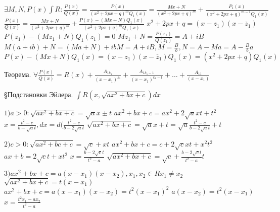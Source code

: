 \documentclass[12pt]{article}
\begin{document}
    $\exists M, N, P(x) \int R: \frac{P(x)}{Q(x)} = \frac{P(x)}{(x^2 + 2px + q)^m Q_1(x)} = \frac{Mx + N}{(x^2 + 2px + q)^m} + \frac{P_1(x)}{(x^2 + 2px + q)^{m-1} Q_1(x)}$ \newline
    $\frac{P(x)}{Q(x)} = \frac{Mx + N}{(x^2 + 2px + q)^m} + \frac{P(x) - (Mx + N)Q_1(x)}{(x^2 + 2px + q)^m Q_1(x)}$ \newline
    $x^2 + 2px + q = (x - z_1)(x - \overline z_1)$ \newline
    $P(z_1) - (Mz_1 + N)Q_1(z_1) = 0$ \newline
    $Mz_1 + N = \frac{P(z_1)}{Q(z_1)} = A + iB$ \newline
    $M(a+ib) + N = (Ma+N) + ibM = A + iB, M = \frac{B}b, N = A - Ma = A - \frac{B}b a$
    $P(x) - (Mx + N)Q_1(x) = (x-z_1)(x-\overline z_1)Q_1(x) = (x^2 + 2px + q) Q_1(x)$ \newline

    Теорема. $\forall \frac{P(x)}{Q(x)} = R(x) + \frac{A_{1 k_1}}{(x-x_1)^{k_1}} + \frac{A_{1 k_1 - 1}}{(x-x_1)^{k_1 - 1}} + \dots + \frac{A_{1 1}}{(x-x_1)}$ \newline

    \S Подстановки Эйлера. \newline
    $\int R(x, \sqrt{ax^2 + bx + c})dx$ \newline

    $1) a > 0: \sqrt{ax^2 + bx + c} = \sqrt{a}x \pm t$ \newline
    $ ax^2 + bx + c = ax^2 + 2\sqrt{a}xt + t^2$ \newline
    $ x = \frac{t^2 - c}{b - \sqrt{a}t}, dx = d(\frac{t^2 - c}{b - 2\sqrt{a}t}$ \newline
    $\sqrt{ax^2 + bx + c} = \sqrt{a}x + t = \sqrt{a}\frac{t^2 - c}{b - 2\sqrt{a}t} + t$ \newline

    $2) c > 0: \sqrt{ax^2 + bc + c} = \sqrt{c} + xt$ \newline
    $ax^2 + bx + c = c + 2\sqrt{c}xt + x^2t^2$ \newline
    $ax + b = 2\sqrt{c}t + xt^2$ \newline
    $x = \frac{b - 2\sqrt{c}t}{t^2 - a}$ \newline
    $\sqrt{ax^2 + bx + c} = \sqrt{c} + \frac{b - 2\sqrt{c}t}{t^2 - a}t$ \newline

    $3) ax^2 + bx + c = a(x-x_1)(x-x_2), x_1, x_2 \in R x_1 \not = x_2$ \newline
    $\sqrt{ax^2 + bx + c} = t(x - x_1)$ \newline
    $ax^2 + bx + c = a(x - x_1)(x - x_2)= t^2 (x - x_1)^2$ \newline
    $a(x - x_2) = t^2(x - x_1)$ \newline
    $x = \frac{t^2x_1 - ax_2}{t^2 - a}$ \newline
\end{document}
